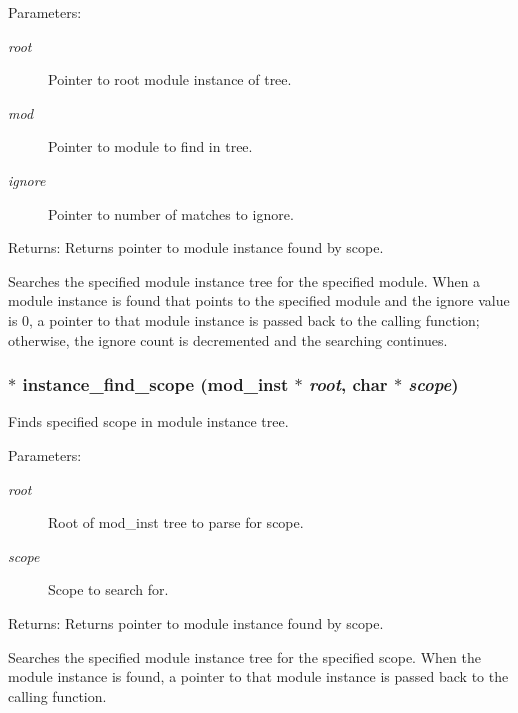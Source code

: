 \begin{Desc}
\item[Parameters:]
\begin{description}
\item[{\em root}]Pointer to root module instance of tree. \item[{\em mod}]Pointer to module to find in tree. \item[{\em ignore}]Pointer to number of matches to ignore.\end{description}
\end{Desc}
\begin{Desc}
\item[Returns:]Returns pointer to module instance found by scope.\end{Desc}
Searches the specified module instance tree for the specified module. When a module instance is found that points to the specified module and the ignore value is 0, a pointer to that module instance is passed back to the calling function; otherwise, the ignore count is decremented and the searching continues. 
\subsubsection{$\ast$ instance\_\-find\_\-scope ({\bf mod\_\-inst} $\ast$ {\em root}, char $\ast$ {\em scope})}\label{instance_8c_a3}


Finds specified scope in module instance tree.

\begin{Desc}
\item[Parameters:]
\begin{description}
\item[{\em root}]Root of mod\_\-inst tree to parse for scope. \item[{\em scope}]Scope to search for.\end{description}
\end{Desc}
\begin{Desc}
\item[Returns:]Returns pointer to module instance found by scope.\end{Desc}
Searches the specified module instance tree for the specified scope. When the module instance is found, a pointer to that module instance is passed back to the calling function. 
